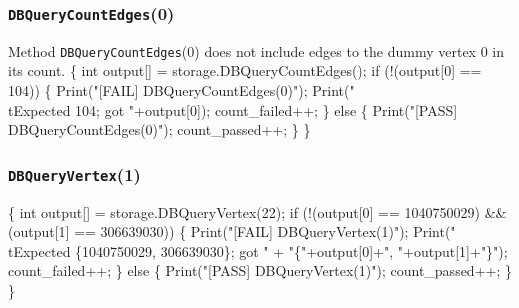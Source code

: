 \documentclass{article}
\def\nwendcode{\endtrivlist \endgroup}
\let\nwdocspar=\par
\theoremstyle{definition}
\begin{document}
\subsubsection{{\tt{}DBQueryCountEdges}(0)}
Method {\tt{}DBQueryCountEdges}(0) does not include edges to the dummy vertex 0 in
its count.
\nwenddocs{}\endmoddef{}
\{
  int output[] = storage.DBQueryCountEdges();
  if (!(output[0] == 104)) \{
    Print("[FAIL] DBQueryCountEdges(0)");
    Print("\\tExpected 104; got "+output[0]);
    count_failed++;
  \} else \{
    Print("[PASS] DBQueryCountEdges(0)");
    count_passed++;
  \}
\}
\nwendcode{}\nwdocspar
\subsubsection{{\tt{}DBQueryVertex}(1)}
\nwenddocs{}\endmoddef{}
\{
  int output[] = storage.DBQueryVertex(22);
  if (!(output[0] == 1040750029)
    && (output[1] == 306639030)) \{
    Print("[FAIL] DBQueryVertex(1)");
    Print("\\tExpected \{1040750029, 306639030\}; got "
      + "\{"+output[0]+", "+output[1]+"\}");
    count_failed++;
  \} else \{
    Print("[PASS] DBQueryVertex(1)");
    count_passed++;
  \}
\}
\nwendcode{}\nwdocspar
\end{document}
